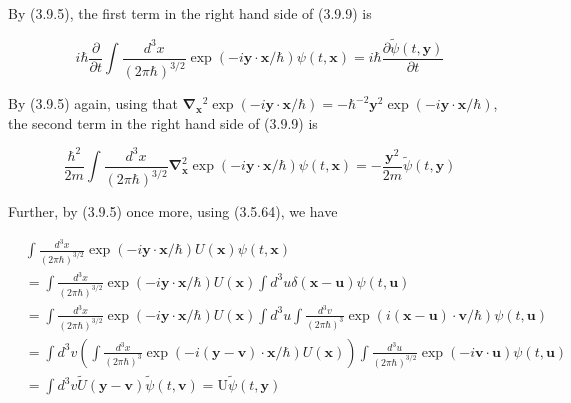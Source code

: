 \documentclass{article}
\begin{document}
By (3.9.5), the first term in the right hand side of (3.9.9) is
 
\begin{equation*}
i \hbar \frac{\partial}{\partial t} \int \frac{d^{3} x}{(2 \pi \hbar)^{3 / 2}} \exp (-i \boldsymbol{y} \cdot \boldsymbol{x} / \hbar) \psi(t, \boldsymbol{x})=i \hbar \frac{\partial \tilde{\psi}(t, \boldsymbol{y})}{\partial t} \tag{3.9.10}
\end{equation*}
 

By (3.9.5) again, using that $\boldsymbol{\nabla}_{\boldsymbol{x}}{ }^{2} \exp (-i \boldsymbol{y} \cdot \boldsymbol{x} / \hbar)=-\hbar^{-2} \boldsymbol{y}^{2} \exp (-i \boldsymbol{y} \cdot \boldsymbol{x} / \hbar)$, the second term in the right hand side of (3.9.9) is
 
\begin{equation*}
\frac{\hbar^{2}}{2 m} \int \frac{d^{3} x}{(2 \pi \hbar)^{3 / 2}} \boldsymbol{\nabla}_{\boldsymbol{x}}^{2} \exp (-i \boldsymbol{y} \cdot \boldsymbol{x} / \hbar) \psi(t, \boldsymbol{x})=-\frac{\boldsymbol{y}^{2}}{2 m} \tilde{\psi}(t, \boldsymbol{y}) \tag{3.9.11}
\end{equation*}
 

Further, by (3.9.5) once more, using (3.5.64), we have
 
\begin{align*}
& \int \frac{d^{3} x}{(2 \pi \hbar)^{3 / 2}} \exp (-i \boldsymbol{y} \cdot \boldsymbol{x} / \hbar) U(\boldsymbol{x}) \psi(t, \boldsymbol{x})  \tag{3.9.12}\\
& =\int \frac{d^{3} x}{(2 \pi \hbar)^{3 / 2}} \exp (-i \boldsymbol{y} \cdot \boldsymbol{x} / \hbar) U(\boldsymbol{x}) \int d^{3} u \delta(\boldsymbol{x}-\boldsymbol{u}) \psi(t, \boldsymbol{u}) \\
& =\int \frac{d^{3} x}{(2 \pi \hbar)^{3 / 2}} \exp (-i \boldsymbol{y} \cdot \boldsymbol{x} / \hbar) U(\boldsymbol{x}) \int d^{3} u \int \frac{d^{3} v}{(2 \pi \hbar)^{3}} \exp (i(\boldsymbol{x}-\boldsymbol{u}) \cdot \boldsymbol{v} / \hbar) \psi(t, \boldsymbol{u}) \\
& =\int d^{3} v\left(\int \frac{d^{3} x}{(2 \pi \hbar)^{3}} \exp (-i(\boldsymbol{y}-\boldsymbol{v}) \cdot \boldsymbol{x} / \hbar) U(\boldsymbol{x})\right) \int \frac{d^{3} u}{(2 \pi \hbar)^{3 / 2}} \exp (-i \boldsymbol{v} \cdot \boldsymbol{u}) \psi(t, \boldsymbol{u}) \\
& =\int d^{3} v \tilde{U}(\boldsymbol{y}-\boldsymbol{v}) \tilde{\psi}(t, \boldsymbol{v})=\mathrm{U} \tilde{\psi}(t, \boldsymbol{y})
\end{align*}
 
\end{document}
